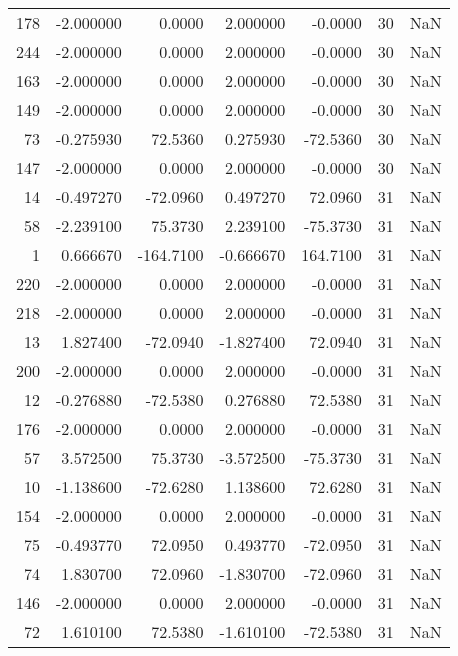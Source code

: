 \begin{tabular}{rrrrrrr}
178 &  -2.000000 &    0.0000 &   2.000000 &     -0.0000 &          30 & NaN \\
244 &  -2.000000 &    0.0000 &   2.000000 &     -0.0000 &          30 & NaN \\
163 &  -2.000000 &    0.0000 &   2.000000 &     -0.0000 &          30 & NaN \\
149 &  -2.000000 &    0.0000 &   2.000000 &     -0.0000 &          30 & NaN \\
 73 &  -0.275930 &   72.5360 &   0.275930 &    -72.5360 &          30 & NaN \\
147 &  -2.000000 &    0.0000 &   2.000000 &     -0.0000 &          30 & NaN \\
 14 &  -0.497270 &  -72.0960 &   0.497270 &     72.0960 &          31 & NaN \\
 58 &  -2.239100 &   75.3730 &   2.239100 &    -75.3730 &          31 & NaN \\
  1 &   0.666670 & -164.7100 &  -0.666670 &    164.7100 &          31 & NaN \\
220 &  -2.000000 &    0.0000 &   2.000000 &     -0.0000 &          31 & NaN \\
218 &  -2.000000 &    0.0000 &   2.000000 &     -0.0000 &          31 & NaN \\
 13 &   1.827400 &  -72.0940 &  -1.827400 &     72.0940 &          31 & NaN \\
200 &  -2.000000 &    0.0000 &   2.000000 &     -0.0000 &          31 & NaN \\
 12 &  -0.276880 &  -72.5380 &   0.276880 &     72.5380 &          31 & NaN \\
176 &  -2.000000 &    0.0000 &   2.000000 &     -0.0000 &          31 & NaN \\
 57 &   3.572500 &   75.3730 &  -3.572500 &    -75.3730 &          31 & NaN \\
 10 &  -1.138600 &  -72.6280 &   1.138600 &     72.6280 &          31 & NaN \\
154 &  -2.000000 &    0.0000 &   2.000000 &     -0.0000 &          31 & NaN \\
 75 &  -0.493770 &   72.0950 &   0.493770 &    -72.0950 &          31 & NaN \\
 74 &   1.830700 &   72.0960 &  -1.830700 &    -72.0960 &          31 & NaN \\
146 &  -2.000000 &    0.0000 &   2.000000 &     -0.0000 &          31 & NaN \\
 72 &   1.610100 &   72.5380 &  -1.610100 &    -72.5380 &          31 & NaN \\

\end{tabular}
